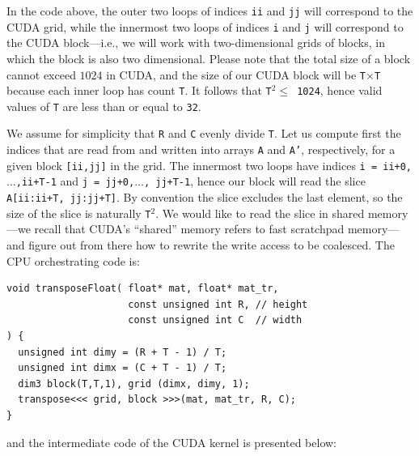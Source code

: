 \documentclass[acmsmall,review]{acmart}\settopmatter{printfolios=true,printccs=false,printacmref=false}
\begin{document}
In the code above, the outer two loops of indices {\tt ii} and {\tt jj}
will correspond to the CUDA grid, while the innermost two loops of
indices {\tt i} and {\tt j} will correspond to the CUDA block---i.e.,
we will work with two-dimensional grids of blocks, in which the block
is also two dimensional. Please note that the total size of a block
cannot exceed $1024$ in CUDA, and the size of our CUDA block will be
{\tt T$\times$T} because each inner loop has count {\tt T}. It follows
that {\tt T$^2 \leq$ 1024}, hence valid values of {\tt T} are less than
or equal to {\tt 32}.

We assume for simplicity that {\tt R} and {\tt C} evenly divide {\tt T}.
Let us compute first the indices that are read from and written into
arrays {\tt A} and {\tt A'}, respectively, for a given block 
{\tt [ii,jj]} in the grid.  The innermost two loops have indices
{\tt i = ii+0,$\ldots$,ii+T-1} and {\tt j = jj+0,$\ldots$, jj+T-1},
hence our block will read the slice {\tt A[ii:ii+T, jj:jj+T]}.
By convention the slice excludes the last element, so the size of
the slice is naturally {\tt T$^2$}. We would like to read the slice
in shared memory---we recall that CUDA's ``shared'' memory refers to 
fast scratchpad memory---and figure out from there how to rewrite the
write access to be coalesced. 
The CPU orchestrating code is:  
\begin{lstlisting}[mathescape=true]
void transposeFloat( float* mat, float* mat_tr, 
                     const unsigned int R, // height 
                     const unsigned int C  // width
) {
  unsigned int dimy = (R + T - 1) / T;
  unsigned int dimx = (C + T - 1) / T;
  dim3 block(T,T,1), grid (dimx, dimy, 1);
  transpose<<< grid, block >>>(mat, mat_tr, R, C);
}
\end{lstlisting}\vspace{-1ex}
and the intermediate code of the CUDA kernel is presented below:\smallskip
\end{document}

